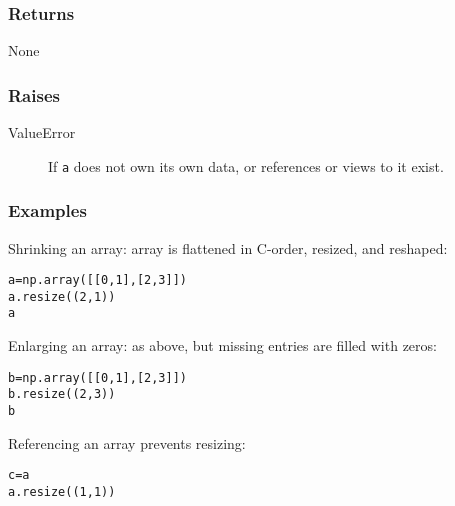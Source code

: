 \begin{boxedminipage}{\textwidth}
\hypertarget{returns}{}
\subsubsection*{Returns}

None



\hypertarget{raises}{}
\subsubsection*{Raises}
\begin{description}
\item[{ValueError}] %

If \texttt{a} does not own its own data, or references or views to it exist.

\end{description}



\hypertarget{examples}{}
\subsubsection*{Examples}

Shrinking an array: array is flattened in C-order, resized, and reshaped:
\begin{alltt}
\pysrcprompt{{\textgreater}{\textgreater}{\textgreater} }a = np.array([[0,1],[2,3]])
\pysrcprompt{{\textgreater}{\textgreater}{\textgreater} }a.resize((2,1))
\pysrcprompt{{\textgreater}{\textgreater}{\textgreater} }a
\pysrcoutput{array([[0],}
\pysrcoutput{       [1]])}\end{alltt}

Enlarging an array: as above, but missing entries are filled with zeros:
\begin{alltt}
\pysrcprompt{{\textgreater}{\textgreater}{\textgreater} }b = np.array([[0,1],[2,3]])
\pysrcprompt{{\textgreater}{\textgreater}{\textgreater} }b.resize((2,3))
\pysrcprompt{{\textgreater}{\textgreater}{\textgreater} }b
\pysrcoutput{array([[0, 1, 2],}
\pysrcoutput{       [3, 0, 0]])}\end{alltt}

Referencing an array prevents resizing:
\begin{alltt}
\pysrcprompt{{\textgreater}{\textgreater}{\textgreater} }c = a
\pysrcprompt{{\textgreater}{\textgreater}{\textgreater} }a.resize((1,1))
\end{alltt}
    \vspace{1ex}

    \end{boxedminipage}

